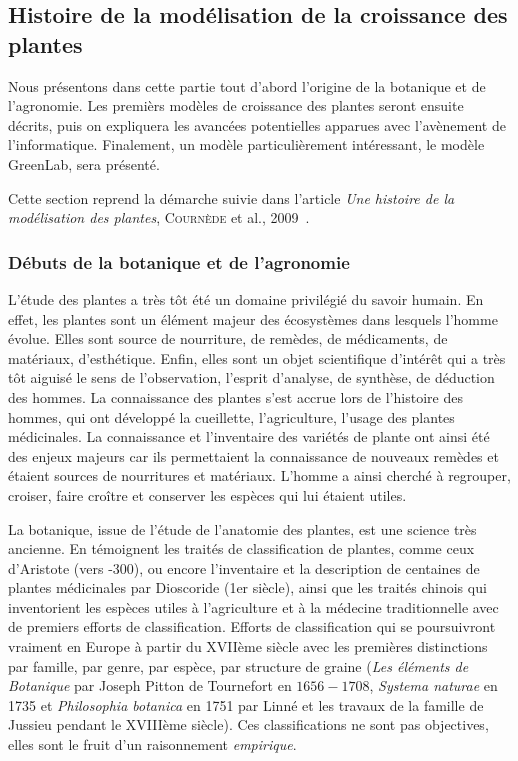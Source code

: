 \subsection{Histoire de la modélisation de la croissance des plantes}
Nous présentons dans cette partie tout d'abord l'origine
de la botanique et de l'agronomie. Les premièrs modèles
de croissance des plantes seront ensuite décrits,
puis on expliquera les avancées potentielles apparues avec
l'avènement de l'informatique.
Finalement, un modèle particulièrement intéressant,
le modèle GreenLab, sera présenté.

Cette section reprend la démarche suivie dans 
l'article \emph{Une histoire de la modélisation des plantes}, \textsc{Cournède} et al., 2009~\cite{histoire_mod_plantes}.

\subsubsection{Débuts de la botanique et de l'agronomie}
L’étude des plantes a très tôt été un domaine privilégié du savoir humain.
En effet, les plantes sont un élément majeur des écosystèmes dans lesquels l’homme évolue. Elles sont source de nourriture, de remèdes, de médicaments,
de matériaux, d’esthétique. 
Enfin, elles sont un objet scientifique d’intérêt qui a très tôt aiguisé le sens de l’observation, l’esprit d’analyse, de synthèse, de déduction des hommes. 
La connaissance des plantes s’est accrue lors de l’histoire des hommes, qui ont développé la cueillette, l’agriculture, l’usage des plantes
médicinales. 
La connaissance et l’inventaire des variétés de plante ont ainsi été des
enjeux majeurs car ils permettaient la connaissance de nouveaux remèdes
et étaient sources de nourritures et matériaux. 
L’homme a ainsi cherché à regrouper, croiser, faire croître 
et conserver les espèces qui lui étaient utiles.

La botanique, issue de l’étude de l’anatomie des plantes,
est une science très ancienne.
En témoignent les traités de classification de plantes, comme ceux
d’Aristote (vers -300), ou encore l’inventaire et la description de
centaines de plantes médicinales par Dioscoride (1er siècle),
ainsi que les traités chinois qui inventorient les espèces utiles à
l’agriculture et à la médecine traditionnelle avec de premiers efforts
de classification. 
Efforts de classification qui se poursuivront vraiment en Europe à partir du
XVIIème siècle avec les premières distinctions par famille, par genre,
par espèce, par structure de graine (\emph{Les éléments de Botanique} par
Joseph Pitton de Tournefort en $1656-1708$, \emph{Systema naturae} en 1735
et \emph{Philosophia botanica} en 1751 par Linné et les travaux de la
famille de Jussieu pendant le XVIIIème siècle).
Ces classifications ne sont pas objectives, 
elles sont le fruit d’un raisonnement \emph{empirique}.

